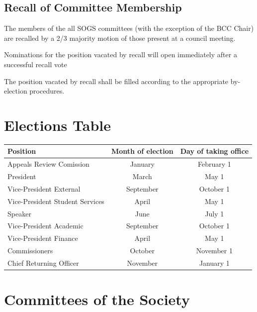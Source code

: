\subsection{Recall of Committee Membership}
\begin{longenum}
\item The members of the all SOGS committees (with the exception of the BCC Chair) are recalled by a 2/3 majority motion of those present at a council meeting.
\item  Nominations for the position vacated by recall will open immediately after a successful recall vote
\item The position vacated by recall shall be filled according to the appropriate by-election procedures.
\end{longenum}
\newpage

\section{Elections Table}

\begin{center}
    \begin{tabular}{ l |c   c }

    Position & Month of election & Day of taking office \\  \hline
    Appeals Review Comission & January & February 1\\ 
    President & March & May 1\\
    Vice-President External & September & October 1 \\ 
    Vice-President Student Services & April & May 1 \\ 
    Speaker & June & July 1 \\ 
    Vice-President Academic & September & October 1 \\ 
    Vice-President Finance  & April & May 1 \\ 
    Commissioners & October & November  1 \\ 
    Chief Returning Officer & November & January 1 \\ 

\end{tabular}
\end{center}


\newpage

\section{Committees of the Society}
